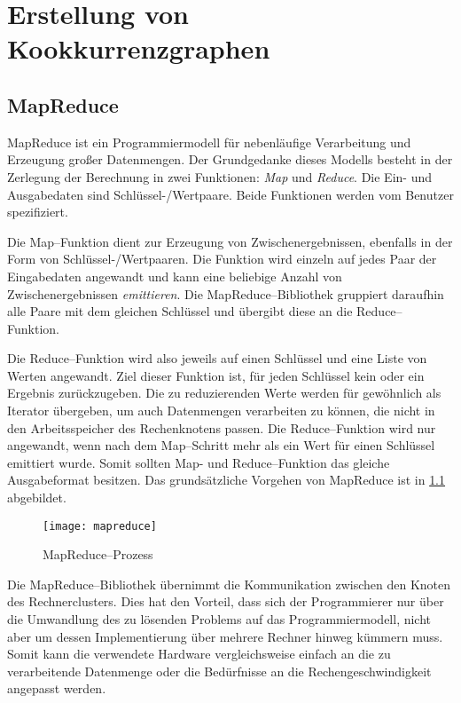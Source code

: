 \chapter{Erstellung von Kookkurrenzgraphen}

\section{MapReduce}
\label{mapreduce}

MapReduce \cite{dg2004} ist ein Programmiermodell für nebenläufige Verarbeitung und Erzeugung großer Datenmengen. Der Grundgedanke dieses Modells besteht in der Zerlegung der Berechnung in zwei Funktionen: \emph{Map} und \emph{Reduce}. Die Ein- und Ausgabedaten sind Schlüssel-/Wertpaare. Beide Funktionen werden vom Benutzer spezifiziert.

Die Map--Funktion dient zur Erzeugung von Zwischenergebnissen, ebenfalls in der Form von Schlüssel-/Wertpaaren. Die Funktion wird einzeln auf jedes Paar der Eingabedaten angewandt und kann eine beliebige Anzahl von Zwischenergebnissen \emph{emittieren}. Die MapReduce--Bibliothek gruppiert daraufhin alle Paare mit dem gleichen Schlüssel und übergibt diese an die Reduce--Funktion.

Die Reduce--Funktion wird also jeweils auf einen Schlüssel und eine Liste von Werten angewandt. Ziel dieser Funktion ist, für jeden Schlüssel kein oder ein Ergebnis zurückzugeben. Die zu reduzierenden Werte werden für gewöhnlich als Iterator übergeben, um auch Datenmengen verarbeiten zu können, die nicht in den Arbeitsspeicher des Rechenknotens passen. Die Reduce--Funktion wird nur angewandt, wenn nach dem Map--Schritt mehr als ein Wert für einen Schlüssel emittiert wurde. Somit sollten Map- und Reduce--Funktion das gleiche Ausgabeformat besitzen. Das grundsätzliche Vorgehen von MapReduce ist in \cref{fig:mapreduce} abgebildet.

\begin{figure}
\centering
\texttt{[image: mapreduce]}
\caption{MapReduce--Prozess}
\label{fig:mapreduce}
\end{figure}

Die MapReduce--Bibliothek übernimmt die Kommunikation zwischen den Knoten des Rechnerclusters. Dies hat den Vorteil, dass sich der Programmierer nur über die Umwandlung des zu lösenden Problems auf das Programmiermodell, nicht aber um dessen Implementierung über mehrere Rechner hinweg kümmern muss. Somit kann die verwendete Hardware vergleichsweise einfach an die zu verarbeitende Datenmenge oder die Bedürfnisse an die Rechengeschwindigkeit angepasst werden.

